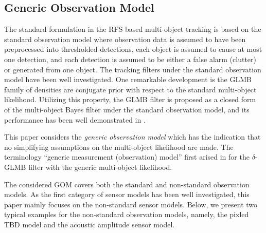 \documentclass[journal]{IEEEtran}
\begin{document}
\subsection{Generic Observation Model}
The standard formulation in the RFS based multi-object tracking is based on the standard observation model \cite{refr:tracking-2} where observation data is assumed to have been preprocessed into thresholded detections,  each object is assumed to cause at most one detection, and each detection is assumed to be either a false alarm (clutter) or generated from one object. The tracking filters under the standard observation model have  been well investigated. One remarkable development is    the GLMB family of densities are conjugate prior with respect to the standard multi-object likelihood. Utilizing this property, the GLMB filter is proposed as a closed form of the multi-object Bayes filter under the standard observation model, and its   performance has been well demonstrated in \cite{refr:label_1,refr:label_2}.

This paper considers the \textit{generic observation model }which  has the indication that  no simplifying assumptions on the multi-object likelihood are made. The terminology ``generic measurement (observation) model''  first arised in \cite{refr:label_6} for  the $\delta$-GLMB filter with the  generic multi-object likelihood.




The  considered GOM  covers both the standard and non-standard observation models.  As the first  category of sensor models has been well  investigated, this paper mainly focuses on the non-standard  sensor models.  Below, we present two typical examples for the non-standard observation models, namely, the pixled TBD model
 and the acoustic amplitude sensor model.
 
\end{document}
